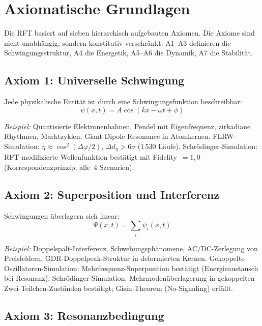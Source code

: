 \documentclass[12pt]{iopart}
\begin{document}
	
	\section{Axiomatische Grundlagen}
	
	Die RFT basiert auf sieben hierarchisch aufgebauten Axiomen.
	Die Axiome sind nicht unabh\"angig, sondern konstitutiv
	verschr\"ankt: A1--A3 definieren die Schwingungsstruktur,
	A4 die Energetik, A5--A6 die Dynamik, A7 die Stabilit\"at.
	
	\subsection{Axiom 1: Universelle Schwingung}
	
	Jede physikalische Entit\"at ist durch eine
	Schwingungsfunktion beschreibbar:
	\begin{equation}
		\psi(x, t) = A \cos(kx - \omega t + \phi)
		\label{eq:oscillation}
	\end{equation}
	
	\textit{Beispiel:} Quantisierte Elektronenbahnen, Pendel mit
	Eigenfrequenz, zirkadiane Rhythmen, Marktzyklen,
	Giant Dipole Resonance in Atomkernen.
	FLRW-Simulation: $\eta \approx \cos^2(\Delta\varphi/2)$,
	$\Delta d_\eta > 6\sigma$ (1\,530 L\"aufe).
	Schr\"odinger-Simulation: RFT-modifizierte Wellenfunktion
	best\"atigt mit Fidelity~$= 1{,}0$ (Korrespondenzprinzip, alle~4 Szenarien).
	
	\subsection{Axiom 2: Superposition und Interferenz}
	
	Schwingungen \"uberlagern sich linear:
	\begin{equation}
		\Psi(x, t) = \sum_i \psi_i(x, t)
		\label{eq:superposition}
	\end{equation}
	
	\textit{Beispiel:} Doppelspalt-Interferenz,
	Schwebungsph\"anomene, AC/DC-Zerlegung von Preisfeldern,
	GDR-Doppelpeak-Struktur in deformierten Kernen.
	Gekoppelte-Oszillatoren-Simulation: Mehrfrequenz-Superposition
	best\"atigt (Energieaustausch bei Resonanz).
	Schr\"odinger-Simulation: Mehrmodenüberlagerung in gekoppelten
	Zwei-Teilchen-Zust\"anden best\"atigt; Gisin-Theorem (No-Signaling) erf\"ullt.
	
	\subsection{Axiom 3: Resonanzbedingung}
	
\end{document}
